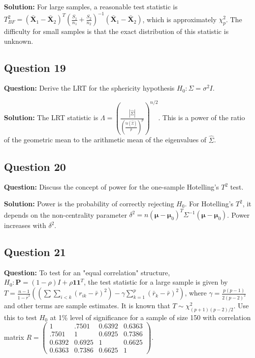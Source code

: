 \textbf{Solution:}
For large samples, a reasonable test statistic is $T^2_{BF} = (\bar{\mathbf{X}}_1 - \bar{\mathbf{X}}_2)^T \left( \frac{S_1}{n_1} + \frac{S_2}{n_2} \right)^{-1} (\bar{\mathbf{X}}_1 - \bar{\mathbf{X}}_2)$, which is approximately $\chi^2_p$. The difficulty for small samples is that the exact distribution of this statistic is unknown.

\subsection*{Question 19}
\textbf{Question:} Derive the LRT for the sphericity hypothesis $H_0: \Sigma = \sigma^2 I$.

\textbf{Solution:}
The LRT statistic is $\Lambda = \left( \frac{|\hat{\Sigma}|}{(\frac{\text{tr}(\hat{\Sigma})}{p})^p} \right)^{n/2}$. This is a power of the ratio of the geometric mean to the arithmetic mean of the eigenvalues of $\hat{\Sigma}$.

\subsection*{Question 20}
\textbf{Question:} Discuss the concept of power for the one-sample Hotelling's $T^2$ test.

\textbf{Solution:}
Power is the probability of correctly rejecting $H_0$. For Hotelling's $T^2$, it depends on the non-centrality parameter $\delta^2 = n(\boldsymbol{\mu} - \boldsymbol{\mu}_0)^T \Sigma^{-1} (\boldsymbol{\mu} - \boldsymbol{\mu}_0)$. Power increases with $\delta^2$.

\subsection*{Question 21}
\textbf{Question:} To test for an "equal correlation" structure, $H_0: \mathbf{P} = (1-\rho)I + \rho\mathbf{1}\mathbf{1}^T$, the test statistic for a large sample is given by $T = \frac{n-1}{1-\bar{r}^2}((\sum\sum_{i<k} (r_{ik} - \bar{r})^2) - \gamma \sum_{k=1}^p (\bar{r}_k - \bar{r})^2)$, where $\gamma = \frac{p(p-1)}{2(p-2)^2}$ and other terms are sample estimates. It is known that $T \sim \chi^2_{(p+1)(p-2)/2}$. Use this to test $H_0$ at 1\% level of significance for a sample of size 150 with correlation matrix $R = \begin{pmatrix} 1 & .7501 & 0.6392 & 0.6363 \\ .7501 & 1 & 0.6925 & 0.7386 \\ 0.6392 & 0.6925 & 1 & 0.6625 \\ 0.6363 & 0.7386 & 0.6625 & 1 \end{pmatrix}$.

